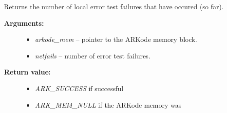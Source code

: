 \documentclass[letterpaper,10pt,english]{sphinxmanual}
\begin{document}
\begin{fulllineitems}
\label{c_interface/User_callable:c.ARKodeGetNumErrTestFails}
Returns the number of local error test failures that
have occured (so far).
\begin{description}
\item[{\textbf{Arguments:}}] \leavevmode\begin{itemize}
\item {} 
\emph{arkode\_mem} -- pointer to the ARKode memory block.

\item {} 
\emph{netfails} -- number of error test failures.

\end{itemize}

\item[{\textbf{Return value:}}] \leavevmode\begin{itemize}
\item {} 
\emph{ARK\_SUCCESS} if successful

\item {} 
\emph{ARK\_MEM\_NULL} if the ARKode memory was 

\end{itemize}

\end{description}

\end{fulllineitems}

\end{document}
